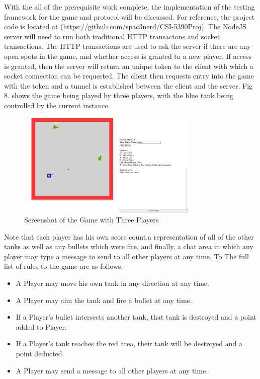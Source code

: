\documentclass[conference]{IEEEtran}
\begin{document}
With the all of the prerequisite work complete, the implementation of the testing framework for the game and protocol will be discussed. For reference,
the project code is located at (https://github.com/spac3nerd/CSI-5390Proj). The NodeJS server 
will need to run both traditional HTTP transactons and socket transactions. The HTTP transactions are used to ask the server if 
there are any open spots in the game, and whether access is granted to a new player. If access is granted, then the server will return 
an unique token to the client with which a socket connection can be requested. The client then requests entry into the game 
with the token and a tunnel is established between the client and the server. Fig 8. shows the game being played by three players, with
the blue tank being controlled by the current instance.  


\begin{figure}[htbp]
\centerline{\includegraphics [width = 9cm, height = 5cm] {GameScreenshot.jpg}}
\caption{Screenshot of the Game with Three Players}
\end{figure}

Note that each player has his own score count,a representation of all of the other tanks as well as any bullets which were fire, and finally, a chat area
in which any player may type a message to send to all other players at any time. To The full list of rules to the game are as follows:

\begin{itemize}
  \item A Player may move his own tank in any direction at any time.
  \item A Player may aim the tank and fire a bullet at any time.
  \item If a Player's bullet intersects another tank, that tank is destroyed and a point added to Player.
  \item If a Player's tank reaches the red area, their tank will be destroyed and a point deducted.
  \item A Player may send a message to all other players at any time.
\end{itemize}
\end{document}
